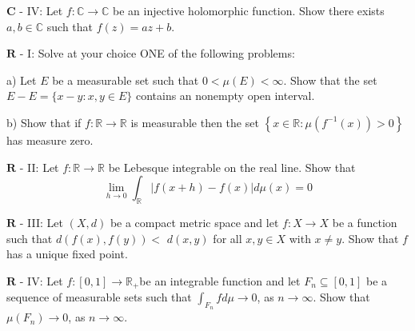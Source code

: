 \documentclass[14pt]{extarticle}
\begin{document}
$\mathbf{C}$ - IV: Let $f: \mathbb{C} \rightarrow \mathbb{C}$ be an injective holomorphic function. Show there exists $a, b \in \mathbb{C}$ such that $f(z)=a z+b .$
\newpage

$\mathbf{R}$ - I: Solve at your choice ONE of the following problems:

a) Let $E$ be a measurable set such that $0<\mu(E)<\infty$. Show that the set $E-E=\{x-y: x, y \in E\}$ contains an nonempty open interval.

b) Show that if $f: \mathbb{R} \rightarrow \mathbb{R}$ is measurable then the set $\left\{x \in \mathbb{R}: \mu\left(f^{-1}(x)\right)>0\right\}$ has measure zero.
\newpage

$\mathbf{R}$ - II: Let $f: \mathbb{R} \rightarrow \mathbb{R}$ be Lebesque integrable on the real line. Show that
$$
\lim _{h \rightarrow 0} \int_{\mathbb{R}}|f(x+h)-f(x)| d \mu(x)=0
$$
\newpage

$\mathbf{R}$ - III: Let $(X, d)$ be a compact metric space and let $f: X \rightarrow X$ be a function such that $d(f(x), f(y))<$ $d(x, y)$ for all $x, y \in X$ with $x \neq y$. Show that $f$ has a unique fixed point.
\newpage

$\mathbf{R}$ - IV: Let $f:[0,1] \rightarrow \mathbb{R}_{+}$be an integrable function and let $F_{n} \subseteq[0,1]$ be a sequence of measurable sets such that $\int_{F_{n}} f d \mu \rightarrow 0$, as $n \rightarrow \infty$. Show that $\mu\left(F_{n}\right) \rightarrow 0$, as $n \rightarrow \infty$.
\newpage
\end{document}
